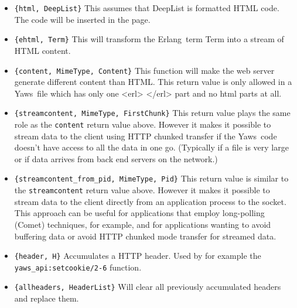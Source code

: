 \documentclass[11pt,oneside,english]{book}
\newcommand{\Erlang}            %
        {{\sc Erlang}}
\newcommand{\Yaws}            %
        {{\sc Yaws}}
\begin{document}
\begin{itemize}


\item       \verb+{html, DeepList}+
              This  assumes that DeepList is formatted HTML code.
              The code will be inserted in the page.

\item       \verb+{ehtml, Term}+
              This will transform the \Erlang\   term  Term  into  a
              stream of HTML content.

\item       \verb+{content, MimeType, Content}+
              This function will make  the  web  server  generate
              different  content  than HTML. This return value is
              only allowed in a \Yaws\   file  which  has  only  one
              <erl> </erl> part and no html parts at all.

\item       \verb+{streamcontent, MimeType, FirstChunk}+
              This  return  value plays the same role as the
              \verb+content+
              return value above.  However it makes it  possible
              to stream data to the client using HTTP chunked transfer
              if the \Yaws\  code doesn't have access to all  the
              data  in  one  go. (Typically  if  a  file  is  very
              large or if data arrives from back end servers on the
              network.)

\item       \verb+{streamcontent_from_pid, MimeType, Pid}+
              This  return  value  is  similar to the
              \verb+streamcontent+ return value above.  However it
              makes it possible to stream data to the client directly
              from an application process to the socket. This
              approach can be useful for applications that employ
              long-polling (Comet) techniques, for example, and for
              applications wanting to avoid buffering data or avoid
              HTTP chunked mode transfer for streamed data.

\item       \verb+{header, H}+
              Accumulates a HTTP header. Used by for example  the
              \verb+yaws_api:setcookie/2-6+ function.

\item       \verb+{allheaders, HeaderList}+
              Will  clear  all previously accumulated headers and
              replace them.


\end{itemize}
\end{document}
